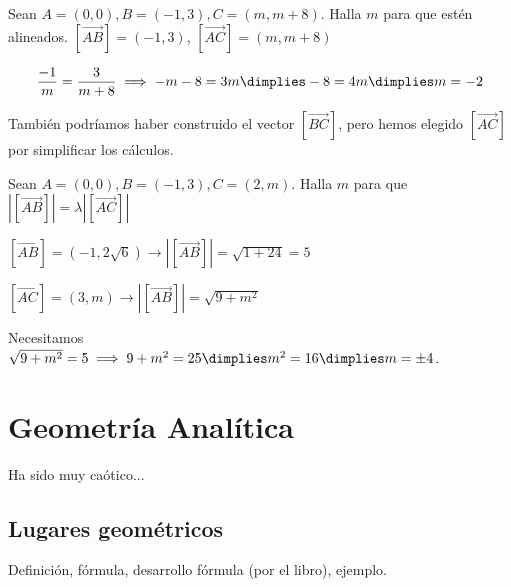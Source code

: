 \begin{problem}
Sean $A=(0,0),B=(-1,3),C=(m,m+8)$. Halla $m$ para que estén alineados.
\solution
$[\vec{AB}] = (-1,3)$, $[\vec{AC}] = (m,m+8)$

\[
	\frac{-1}{m} = \frac{3}{m+8} \implies -m-8 = 3m \dimplies -8=4m \dimplies m=-2
\]

\obs También podríamos haber construido el vector $[\vec{BC}]$, pero hemos elegido $[\vec{AC}]$ por simplificar los cálculos.
\end{problem}

\begin{problem}
Sean $A=(0,0),B=(-1,3),C=(2,m)$. Halla $m$ para que $|[\vec{AB}]| = λ|[\vec{AC}]|$
\solution

$[\vec{AB}] = (-1,2\sqrt{6}) \to |[\vec{AB}]| = \sqrt{1+24}=5$

$[\vec{AC}] = (3,m) \to |[\vec{AB}]| = \sqrt{9+m^2}$

Necesitamos $\sqrt{9+m^2} = 5 \implies 9+m^2 = 25 \dimplies m^2=16 \dimplies m=\pm4$.

\end{problem}

\section{Geometría Analítica}

Ha sido muy caótico...


\subsection{Lugares geométricos}

Definición, fórmula, desarrollo fórmula (por el libro), ejemplo.

